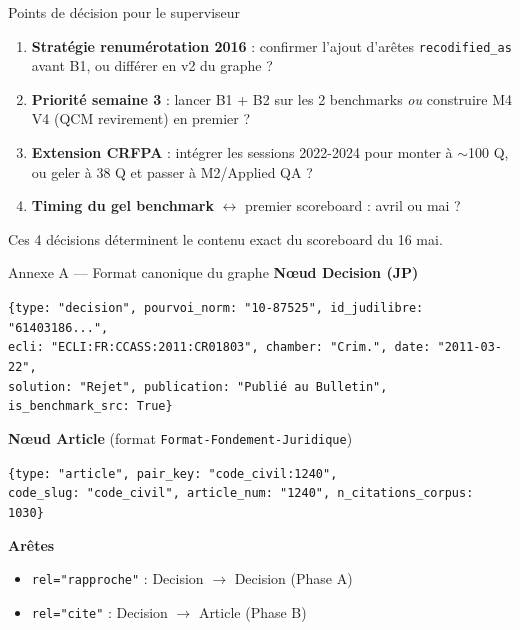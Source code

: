 \documentclass[aspectratio=169,10pt]{beamer}
\newcommand{\keybox}[1]{%
  \begin{center}
  \colorbox{accentsoft}{\parbox{0.92\linewidth}{\centering #1}}
  \end{center}}
\begin{document}
\begin{frame}{Points de décision pour le superviseur}
  \begin{enumerate}
    \item \textbf{Stratégie renumérotation 2016} : confirmer l'ajout d'arêtes \texttt{recodified\_as} avant B1, ou différer en v2 du graphe ?
    \item \textbf{Priorité semaine 3} : lancer B1 + B2 sur les 2 benchmarks \textit{ou} construire M4 V4 (QCM revirement) en premier ?
    \item \textbf{Extension CRFPA} : intégrer les sessions 2022-2024 pour monter à $\sim$100 Q, ou geler à 38 Q et passer à M2/Applied QA ?
    \item \textbf{Timing du gel benchmark} $\leftrightarrow$ premier scoreboard : avril ou mai ?
  \end{enumerate}

  \vspace{0.7em}
  \keybox{\small Ces 4 décisions déterminent le contenu exact du scoreboard du 16 mai.}
\end{frame}

\appendix

\begin{frame}{Annexe A --- Format canonique du graphe}
  \textbf{N\oe ud Decision (JP)}
  \begin{block}{}
    \scriptsize\texttt{\{type: "decision", pourvoi\_norm: "10-87525", id\_judilibre: "61403186...", \\
    ecli: "ECLI:FR:CCASS:2011:CR01803", chamber: "Crim.", date: "2011-03-22", \\
    solution: "Rejet", publication: "Publié au Bulletin", is\_benchmark\_src: True\}}
  \end{block}

  \textbf{N\oe ud Article} (format \texttt{Format-Fondement-Juridique})
  \begin{block}{}
    \scriptsize\texttt{\{type: "article", pair\_key: "code\_civil:1240", \\
    code\_slug: "code\_civil", article\_num: "1240", n\_citations\_corpus: 1030\}}
  \end{block}

  \textbf{Arêtes}
  \begin{itemize}\footnotesize
    \item \texttt{rel="rapproche"} : Decision $\to$ Decision (Phase A)
    \item \texttt{rel="cite"}      : Decision $\to$ Article (Phase B)
  \end{itemize}
\end{frame}
\end{document}
